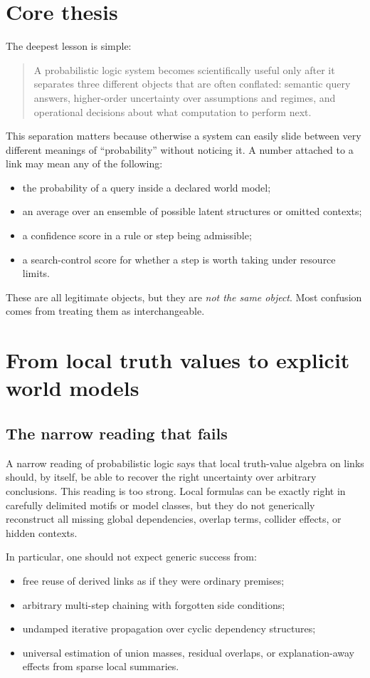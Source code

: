 \documentclass[11pt]{article}
\begin{document}
\section{Core thesis}
The deepest lesson is simple:
\begin{quote}
A probabilistic logic system becomes scientifically useful only after it separates three different objects that are often conflated: semantic query answers, higher-order uncertainty over assumptions and regimes, and operational decisions about what computation to perform next.
\end{quote}

This separation matters because otherwise a system can easily slide between very different meanings of ``probability'' without noticing it. A number attached to a link may mean any of the following:
\begin{itemize}
    \item the probability of a query inside a declared world model;
    \item an average over an ensemble of possible latent structures or omitted contexts;
    \item a confidence score in a rule or step being admissible;
    \item a search-control score for whether a step is worth taking under resource limits.
\end{itemize}

These are all legitimate objects, but they are \emph{not the same object}. Most confusion comes from treating them as interchangeable.

\section{From local truth values to explicit world models}
\subsection{The narrow reading that fails}
A narrow reading of probabilistic logic says that local truth-value algebra on links should, by itself, be able to recover the right uncertainty over arbitrary conclusions. This reading is too strong. Local formulas can be exactly right in carefully delimited motifs or model classes, but they do not generically reconstruct all missing global dependencies, overlap terms, collider effects, or hidden contexts.

In particular, one should not expect generic success from:
\begin{itemize}
    \item free reuse of derived links as if they were ordinary premises;
    \item arbitrary multi-step chaining with forgotten side conditions;
    \item undamped iterative propagation over cyclic dependency structures;
    \item universal estimation of union masses, residual overlaps, or explanation-away effects from sparse local summaries.
\end{itemize}
\end{document}
